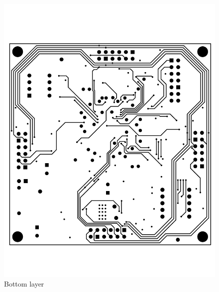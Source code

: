 \begin{appendices}
\begin{figure}[ptb]
	\begin{centering}
		\includegraphics[width=6in]{Appendices/Figures/appendices-layout_bottom.pdf}
		\caption{Bottom layer}
		\label{fig:appendices:layout_bottom}
	\end{centering}
\end{figure}


\end{appendices}
